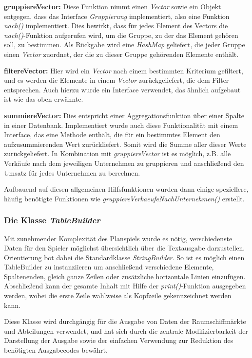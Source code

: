 \begin{seList}
\item \textbf{gruppiereVector:} Diese Funktion nimmt einen \textit{Vector} sowie ein Objekt entgegen, dass das Interface \textit{Gruppierung} implementiert, also eine Funktion \textit{nach()} implementiert. Dies bewirkt, dass für jedes Element des Vectors die \textit{nach()}-Funktion aufgerufen wird, um die Gruppe, zu der das Element gehören soll, zu bestimmen. Als Rückgabe wird eine \textit{HashMap} geliefert, die jeder Gruppe einen \textit{Vector} zuordnet, der die zu dieser Gruppe gehörenden Elemente enthält.
\item \textbf{filtereVector:} Hier wird ein \textit{Vector} nach einem bestimmten Kriterium gefiltert, und es werden die Elemente in einem \textit{Vector} zurückgeliefert, die dem Filter entsprechen. Auch hierzu wurde ein Interface verwendet, das ähnlich aufgebaut ist wie das oben erwähnte.
\item \textbf{summiereVector:} Dies entspricht einer Aggregationsfunktion über einer Spalte in einer Datenbank. Implementiert wurde auch diese Funktionalität mit einem Interface, das eine Methode enthält, die für ein bestimmtes Element den aufzusummierenden Wert zurückliefert. Somit wird die Summe aller dieser Werte zurückgeliefert. In Kombination mit \textit{gruppiereVector} ist es möglich, z.B. alle Verkäufe nach dem jeweiligen Unternehmen zu gruppieren und anschließend den Umsatz für jedes Unternehmen zu berechnen.
\end{seList}

Aufbauend auf diesen allgemeinen Hilfsfunktionen wurden dann einige speziellere, häufig benötigte Funktionen wie \textit{gruppiereVerkaeufeNachUnternehmen()} erstellt.

\subsubsection{Die Klasse \textit{TableBuilder}}
Mit zunehmender Komplexität des Planspiels wurde es nötig, verschiedenste Daten für den Spieler möglichst übersichtlich über die Textausgabe darzustellen. Orientierung bot dabei die Standardklasse \textit{StringBuilder}. So ist es möglich einen TableBuilder zu instanziieren um anschließend verschiedene Elemente, Spaltenenden, gleich ganze Zeilen oder zusätzliche horizontale Linien einzufügen. Abschließend kann der gesamte Inhalt mit Hilfe der \textit{print()}-Funktion ausgegeben werden, wobei die erste Zeile wahlweise als Kopfzeile gekennzeichnet werden kann.

Diese Klasse wird durchgängig für die Ausgabe von Daten der Raumschiffmärkte und Abteilungen verwendet, und hat sich durch die zentrale Modifizierbarkeit der Darstellung der Ausgabe sowie der einfachen Verwendung zur Reduktion des benötigten Ausgabecodes bewährt.

\autorende{}